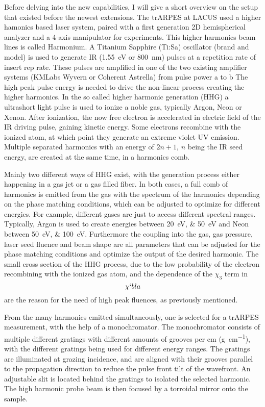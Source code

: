 Before delving into the new capabilities, I will give a short overview on the setup that existed before the newest extensions.
The trARPES at LACUS used a higher hamonics based laser system, paired with a first generation 2D hemispherical analyzer and a 4-axis manipulator for experiments.
This higher harmonics beam lines is called Harmonium.
A Titanium Sapphire (Ti:Sa) oscillator (brand and model) is used to generate IR (\qty{1.55}{\electronvolt} or \qty{800}{\nano\meter}) pulses at a repetition rate of insert rep rate.
These pulses are amplified in one of the two existing amplifier systems (KMLabs Wyvern or Coherent Astrella) from pulse power a to b
The high peak pulse energy is needed to drive the non-linear process creating the higher harmonics.
In the so called higher harmonic generation (HHG) a ultrashort light pulse is used to ionize a noble gas, typically Argon, Neon or Xenon.
After ionization, the now free electron is accelerated in electric field of the IR driving pulse, gaining kinetic energy.
Some electrons recombine with the ionized atom, at which point they generate an extreme violet UV emission.
Multiple separated harmonics with an energy of $2n+1$, $n$ being the IR seed energy, are created at the same time, in a harmonics comb.

Mainly two different ways of HHG exist, with the generation process either happening in a gas jet or a gas filled fiber.
In both cases, a full comb of harmonics is emitted from the gas with the spectrum of the harmonics depending on the phase matching conditions, which can be adjusted to optimize for different energies.
For example, different gases are just to access different spectral ranges.
Typically, Argon is used to create energies between \qtylist{20; 50}{\electronvolt} and Neon between \qtylist{50; 100}{\electronvolt}.
Furthermore the coupling into the gas, gas pressure, laser seed fluence and beam shape are all parameters that can be adjusted for the phase matching conditions and optimize the output of the desired harmonic.
The small cross section of the HHG process, due to the low probability of the electron recombining with the ionized gas atom, and the dependence of the $\chi_3$ term in
\begin{equation}
	\chi `bla
\end{equation}
are the reason for the need of high peak fluences, as previously mentioned.

From the many harmonics emitted simultaneously, one is selected for a trARPES measurement, with the help of a monochromator.
The monochromator consists of multiple different gratings with different amounts of grooves per \unit{cm} (\unit{g\per\cm}), with the different gratings being used for different energy ranges.
The gratings are illuminated at grazing incidence, and are aligned with their grooves parallel to the propagation direction to reduce the pulse front tilt of the wavefront.
An adjustable slit is located behind the gratings to isolated the selected harmonic.
The high harmonic probe beam is then focused by a torroidal mirror onto the sample.

